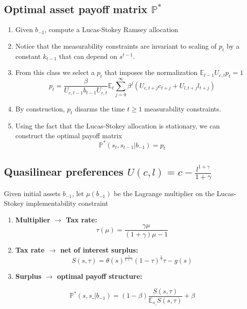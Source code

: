 \documentclass[12pt]{article}
\newcommand{\EE}{\mathbb E}
\begin{document}
\subsection{Optimal asset payoff matrix $\mathbb{P}^*$}
\begin{enumerate}
 \item  Given $b_{-1}$, compute a Lucas-Stokey Ramsey allocation
\

 \item Notice that the measurability constraints are invariant to scaling of $p_t$ by a constant $k_{t-1} $ that can depend on $s^{t-1}$.

 \item From this class we select a  $p_t$ that imposes the normalization  $\mathbb{E}_{t-1}U_{c,t}p_t=1$
\[ p_t =  \frac{\beta}{U_{c,t-1} b_{t-1} U_{c,t}}\EE_t\sum_{j=0}^\infty\beta^j\left( U_{c,t+j}c_{t+j}+U_{l,t+j}l_{t+j}\right) \]
 \item By construction, $p_t$   disarms the time  $t\geq 1$
measurability constraints.

\item Using the fact that the Lucas-Stokey allocation is stationary, we can construct the optimal payoff matrix
\[\mathbb{P}^*(s_t,s_{t-1}|b_{-1})=p_t\]


\end{enumerate}

\subsection{Quasilinear preferences $U(c,l)=c-\frac{l^{1+\gamma}}{1+\gamma}$}
Given
 initial assets $b_{-1}$,  let $\mu(b_{-1})$ be the Lagrange multiplier on the Lucas-Stokey implementability constraint
\begin{enumerate}

 \item \textbf{Multiplier $\to$ Tax rate:}
 \[
		\tau(\mu) = \frac{\gamma\mu}{(1+\gamma)\mu-1}
	\]
 \item \textbf{Tax rate $\to$ net of interest surplus:}
 \[
		S(s,\tau) = \theta(s)^\frac\gamma{1+\gamma}(1-\tau)^\frac1\gamma\tau-g(s)
	\]
\item \textbf{Surplus $\to$ optimal payoff structure:}

\[
 \mathbb{P}^*(s, s\_ |b_{-1}) = (1-\beta)\frac{S(s,\tau)}{\EE_{s\_} S(s,\tau)} + \beta
 \]

 \end{enumerate}
\end{document}
